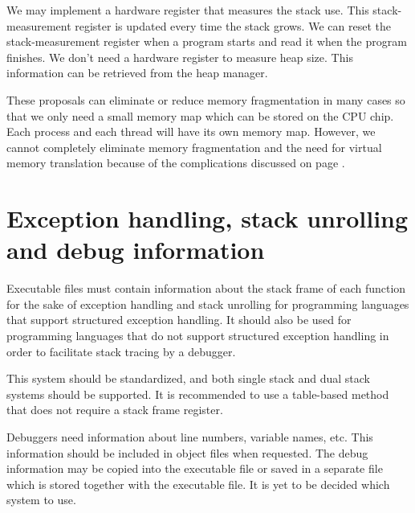 \documentclass[forwardcom.tex]{subfiles}
\begin{document}
We may implement a hardware register that measures the stack use. This stack-measurement register is updated every time the stack grows. We can reset the stack-measurement register when a program starts and read it when the program finishes. We don't need a hardware register to measure heap size. This information can be retrieved from the heap manager. 
\vspace{2mm}

These proposals can eliminate or reduce memory fragmentation in many cases so that we only need a small memory map which can be stored on the CPU chip. Each process and each thread will have its own memory map. However, we cannot completely eliminate memory fragmentation and the need for virtual memory translation because of the complications discussed on page \pageref{memoryManagement}.

\section{Exception handling, stack unrolling and debug information} \label{exceptionHandling}
Executable files must contain information about the stack frame of each function for the sake of exception handling and stack unrolling for programming languages that support structured exception handling. 
It should also be used for programming languages that do not support structured exception handling in order to facilitate stack tracing by a debugger. 
\vspace{2mm}

This system should be standardized, and both single stack and dual stack systems should be supported. 
It is recommended to use a table-based method that does not require a stack frame register. 
\vspace{2mm}

Debuggers need information about line numbers, variable names, etc. This information should be included in object files when requested. The debug information may be copied into the executable file or saved in a separate file which is stored together with the executable file. It is yet to be decided which system to use. 
\end{document}
